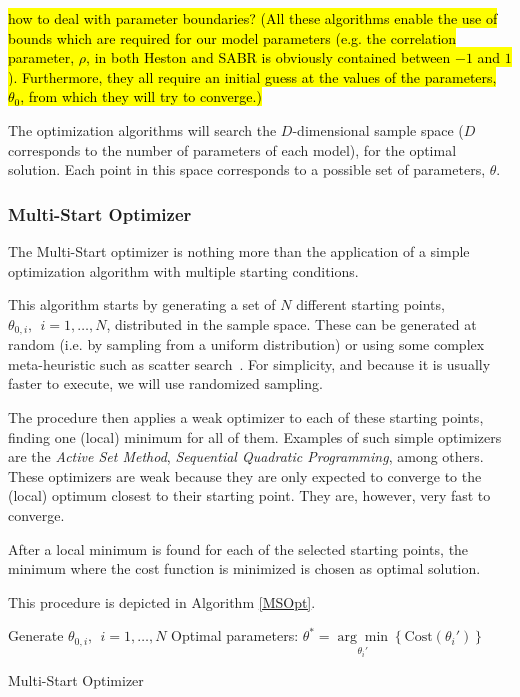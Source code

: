 \hl{how to deal with parameter boundaries? (All these algorithms enable the use of bounds which are required for our model parameters (e.g. the correlation parameter, $\rho$, in both Heston and SABR is obviously contained between $-1$ and $1$). Furthermore, they all require an initial guess at the values of the parameters, $\theta_0$, from which they will try to converge.)}

The optimization algorithms will search the $D$-dimensional sample space ($D$ corresponds to the number of parameters of each model), for the optimal solution. Each point in this space corresponds to a possible set of parameters, $\theta$.

\subsubsection{Multi-Start Optimizer}
The Multi-Start optimizer is nothing more than the application of a simple optimization algorithm with multiple starting conditions.


This algorithm starts by generating a set of $N$ different starting points, $\theta_{0,i},\ \ i=1,\ldots,N$, distributed in the sample space. These can be generated at random (i.e. by sampling from a uniform distribution) or using some complex meta-heuristic such as scatter search~\cite{Ugray}. For simplicity, and because it is usually faster to execute, we will use randomized sampling.


The procedure then applies a weak optimizer to each of these starting points, finding one (local) minimum for all of them. Examples of such simple optimizers are the \emph{Active Set Method}, \emph{Sequential Quadratic Programming}, among others. These optimizers are weak because they are only expected to converge to the (local) optimum closest to their starting point. They are, however, very fast to converge.

After a local minimum is found for each of the selected starting points, the minimum where the cost function is minimized is chosen as optimal solution.

This procedure is depicted in Algorithm \ref{MSOpt}.

\begin{algorithm}[H]\label{MSOpt}
\DontPrintSemicolon
Generate $\theta_{0,i},\ \ i=1,\ldots,N$
 Optimal parameters: $\theta^{*}=\underset{\theta_i'}{\arg\min}\left\{\mathrm{Cost}(\theta_i')\right\}$\;
 \caption{Multi-Start Optimizer}
\end{algorithm}
\ 

